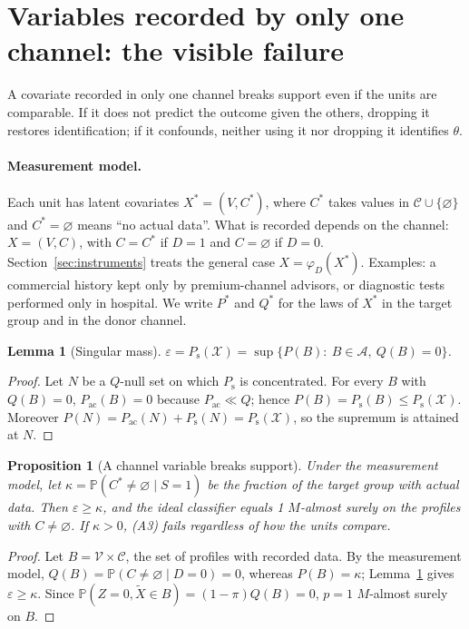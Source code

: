 \documentclass[11pt,a4paper]{article}
\newcommand{\PP}{\mathbb{P}}
\newcommand{\X}{\mathcal{X}}
\newcommand{\A}{\mathcal{A}}
\newcommand{\Pac}{P_{\mathrm{ac}}}
\newcommand{\Ps}{P_{\mathrm{s}}}
\newcommand{\vacio}{\varnothing}
\theoremstyle{plain}
\newtheorem{proposition}{Proposition}
\newtheorem{lemma}{Lemma}
\theoremstyle{definition}
\begin{document}
\section{Variables recorded by only one channel: the visible failure}\label{sec:channel}

A covariate recorded in only one channel breaks support even if the units are comparable. If it does not predict the outcome given the others, dropping it restores identification; if it confounds, neither using it nor dropping it identifies $\theta$.

\paragraph{Measurement model.} Each unit has latent covariates $X^*=(V,C^*)$, where $C^*$ takes values in $\mathcal C\cup\{\vacio\}$ and $C^*=\vacio$ means ``no actual data''. What is recorded depends on the channel: $X=(V,C)$, with $C=C^*$ if $D=1$ and $C=\vacio$ if $D=0$. Section~\ref{sec:instruments} treats the general case $X=\varphi_D(X^*)$. Examples: a commercial history kept only by premium-channel advisors, or diagnostic tests performed only in hospital. We write $P^*$ and $Q^*$ for the laws of $X^*$ in the target group and in the donor channel.

\begin{lemma}[Singular mass]\label{lem:singular}
$\varepsilon=\Ps(\X)=\sup\{P(B):\ B\in\A,\ Q(B)=0\}$.
\end{lemma}
\begin{proof}
Let $N$ be a $Q$-null set on which $\Ps$ is concentrated. For every $B$ with $Q(B)=0$, $\Pac(B)=0$ because $\Pac\ll Q$; hence $P(B)=\Ps(B)\le\Ps(\X)$. Moreover $P(N)=\Pac(N)+\Ps(N)=\Ps(\X)$, so the supremum is attained at $N$.
\end{proof}

\begin{proposition}[A channel variable breaks support]\label{prop:breaks}
Under the measurement model, let $\kappa=\PP(C^*\ne\vacio\mid S=1)$ be the fraction of the target group with actual data. Then $\varepsilon\ge\kappa$, and the ideal classifier equals 1 $M$-almost surely on the profiles with $C\ne\vacio$. If $\kappa>0$, (A3) fails regardless of how the units compare.
\end{proposition}
\begin{proof}
Let $B=\mathcal V\times\mathcal C$, the set of profiles with recorded data. By the measurement model, $Q(B)=\PP(C\ne\vacio\mid D=0)=0$, whereas $P(B)=\kappa$; Lemma~\ref{lem:singular} gives $\varepsilon\ge\kappa$. Since $\PP(Z=0,\tilde X\in B)=(1-\pi)Q(B)=0$, $p=1$ $M$-almost surely on $B$.
\end{proof}
\end{document}
